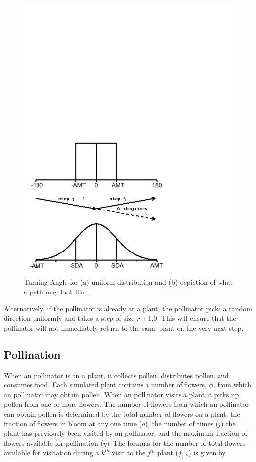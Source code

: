 \begin{figure}[h!]\label{TurningAngle}
\begin{center}
\includegraphics[scale=0.5,trim=0 30 150 510]{TADistribution.pdf}
\end{center}
\caption{Turning Angle for (a) uniform distribution and (b) depiction
of what a path may look like.}
\end{figure}

Alternatively, if the pollinator is already at a plant, the pollinator picks a random direction uniformly
and takes a step of size $r+1.0$.  This will ensure that the pollinator will not immediately return to
the same plant on the very next step.

\subsection{Pollination}

When an pollinator is on a plant, it collects pollen, distributes pollen, and consumes food. Each simulated
plant contains a number of flowers, $\phi$, from which an pollinator may obtain pollen. When an pollinator
visits a plant it picks up pollen from one or more flowers. The number of flowers from which an
pollinator can obtain pollen is determined by the total number of flowers on a plant, the fraction of
flowers in bloom at any one time ($a$), the number of times ($j$) the plant has previously been
visited by an pollinator, and the maximum fraction of flowers available for pollination ($\eta$). The
formula for the number of total flowers available for visitation during a $k^{th}$ visit to the
$j^{th}$ plant ($f_{j,k}$) is given by

